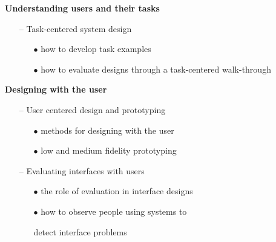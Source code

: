 \documentclass[pdf]{beamer}
\begin{document}
{{{{{{{{\begin{frame}
    \bigskip
    \textbf {Understanding users and their tasks}

    \begin{itemize}
    	\item[{--}] Task-centered system design
        \begin{itemize}
        	\item[{$\bullet$}] how to develop task examples
            \item[{$\bullet$}] how to evaluate designs through a task-centered walk-through
     	\end{itemize}
   	\end{itemize}
     	\bigskip
     	\textbf {Designing with the user}
		\begin{itemize}
        \item[{--}] User centered design and prototyping 
        \begin{itemize}
        	\item[{$\bullet$}] methods for designing with the user
          	\item[{$\bullet$}] low and medium fidelity prototyping
           
        \end{itemize}
        \item[{--}] Evaluating interfaces with users 
        	\begin{itemize}
        	\item[{$\bullet$}] the role of evaluation in interface designs
          	\item[{$\bullet$}] how to observe people using systems to

			detect interface problems
           
        \end{itemize}
	\end{itemize}
\end{frame}}




}}}}}}}
\end{document}
